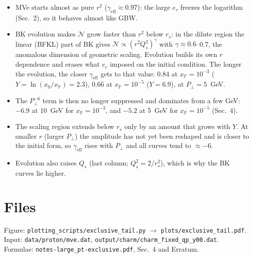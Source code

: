 \documentclass[12pt]{article}
\newcommand{\xpo}{x_{\mathbb{P}}}
\begin{document}
\begin{itemize}
\item MVe starts almost as pure $r^2$ ($\gamma_{\mathrm{eff}}\approx0.97$): the large $e_c$ freezes the logarithm (Sec.~2),
  so it behaves almost like GBW.
\item BK evolution makes $\mathcal N$ grow faster than $r^2$ below $r_s$: in the dilute region the linear (BFKL) part of
  BK gives $\mathcal N\propto(r^2Q_s^2)^{\gamma}$ with $\gamma\approx0.6$--0.7, the anomalous dimension of geometric scaling.
  Evolution builds its own $r$ dependence and erases what $e_c$ imposed on the initial condition. The longer the
  evolution, the closer $\gamma_{\mathrm{eff}}$ gets to that value: 0.84 at $\xpo=10^{-3}$ ($Y=\ln(x_0/\xpo)=2.3$),
  0.66 at $\xpo=10^{-5}$ ($Y=6.9$), at $P_\perp=5$~GeV.
\item The $P_\perp^{-6}$ term is then no longer suppressed and dominates from a few GeV: $-6.9$ at 10~GeV for
  $\xpo=10^{-3}$, and $-5.2$ at 5~GeV for $\xpo=10^{-5}$ (Sec.~4).
\item The scaling region extends below $r_s$ only by an amount that grows with $Y$. At smaller $r$ (larger $P_\perp$) the
  amplitude has not yet been reshaped and is closer to the initial form, so $\gamma_{\mathrm{eff}}$ rises with $P_\perp$
  and all curves tend to $\approx-6$.
\item Evolution also raises $Q_s$ (last column; $Q_s^2=2/r_s^2$), which is why the BK curves lie higher.
\end{itemize}

\section*{Files}
Figure: \texttt{plotting\_scripts/exclusive\_tail.py} $\to$ \texttt{plots/exclusive\_tail.pdf}.
Input: \texttt{data/proton/mve.dat}, \texttt{output/charm/charm\_fixed\_qp\_y00.dat}.
Formulae: \texttt{notes-large\_pt-exclusive.pdf}, Sec.~4 and Erratum.
\end{document}
